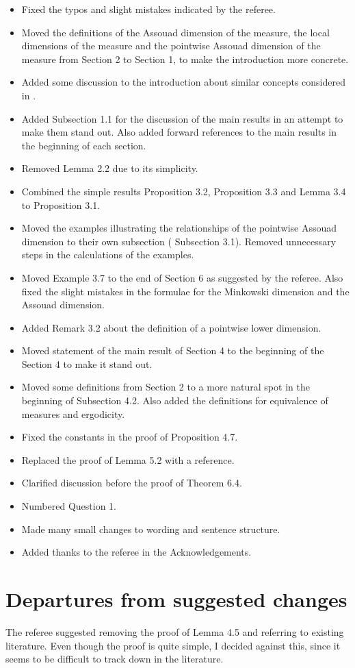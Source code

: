 \documentclass[12pt]{amsart}
\numberwithin{equation}{section}
\newcommand{\old}[1]{{\color{red} #1}}
\newcommand{\new}[1]{{\color{blue} #1}}
\theoremstyle{plain}
\theoremstyle{definition}
\theoremstyle{remark}
\begin{document}
\begin{itemize}
    \item Fixed the typos and slight mistakes indicated by the referee.
    \item Moved the definitions of the Assouad dimension of the measure, the local dimensions of the measure and the pointwise Assouad dimension of the measure from \old{Section 2} to \new{Section 1}, to make the introduction more concrete.
    \item Added some discussion to the introduction about similar concepts considered in \cite{BBL}.
    \item Added \new{Subsection 1.1} for the discussion of the main results in an attempt to make them stand out. Also added forward references to the main results in the beginning of each section.
    \item Removed \old{Lemma 2.2} due to its simplicity.
    \item Combined the simple results \old{Proposition 3.2}, \old{Proposition 3.3} and \old{Lemma 3.4} to \new{Proposition 3.1}.
    \item Moved the examples illustrating the relationships of the pointwise Assouad dimension to their own subsection (\new{Subsection 3.1}). Removed unnecessary steps in the calculations of the examples.
    \item Moved \old{Example 3.7} to the end of \new{Section 6} as suggested by the referee. Also fixed the slight mistakes in the formulae for the Minkowski dimension and the Assouad dimension.
    \item Added \new{Remark 3.2} about the definition of a pointwise lower dimension.
    \item Moved statement of the main result of \old{Section 4} to the beginning of the \new{Section 4} to make it stand out.
    \item Moved some definitions from \old{Section 2} to a more natural spot in the beginning of \new{Subsection 4.2}. Also added the definitions for equivalence of measures and ergodicity.
    \item Fixed the constants in the proof of \old{Proposition 4.7}.
    \item Replaced the proof of \old{Lemma 5.2} with a reference.
    \item Clarified discussion before the proof of \new{Theorem 6.4}.
    \item Numbered \new{Question 1}.
    \item Made many small changes to wording and sentence structure.
    \item Added thanks to the referee in the Acknowledgements.
\end{itemize}
\section*{Departures from suggested changes}
The referee suggested removing the proof of Lemma 4.5 and referring to existing literature. Even though the proof is quite simple, I decided against this, since it seems to be difficult to track down in the literature.



\end{document}
